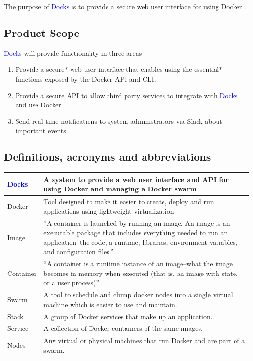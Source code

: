 \documentclass[]{article}
\newcommand{\docks}{\textcolor{Blue}{Docks} }
\newcommand{\docker}{Docker }
\begin{document}
The purpose of \docks is to provide a secure web user interface
for using \docker.

\subsection{Product Scope}

\docks will provide functionality in three areas
\begin{enumerate}
	\item Provide a secure* web user interface that enables using the
	      essential* functions exposed by the \docker API and CLI.
	\item Provide a secure API to allow third party services to integrate
	      with \docks and use \docker
	\item Send real time notifications to system administrators via Slack about
	      important events
\end{enumerate}

\subsection{Definitions, acronyms and abbreviations}

\begin{table}[H]
	\begin{tabular}{|p{2cm}|p{10cm}|}
		\hline
		\docks &  A system to provide a web user interface and API for using \docker and managing a \docker swarm \\ \hline

		\docker & Tool designed to make it easier to create, deploy and run applications
		using lightweight virtualization \\ \hline

		Image & ``A container is launched by running an image.
		An image is an executable package that includes everything
		needed to run an application--the code, a runtime, libraries,
		environment variables, and configuration files.'' \\ \hline

		Container & ``A container is a runtime instance 
		of an image--what the image becomes in memory when 
		executed (that is, an image with state, or a user process)'' \\ \hline
		
		Swarm & A tool to schedule and clump docker nodes into a single virtual machine which is easier to use and maintain. \\ \hline
		
		Stack & A group of Docker services that make up an application. \\ \hline
		
		Service & A collection of Docker containers of the same images. \\ \hline
		
		Nodes & Any virtual or physical machines that run Docker and are part of a swarm. \\ \hline

	\end{tabular}
\end{table}
\end{document}

